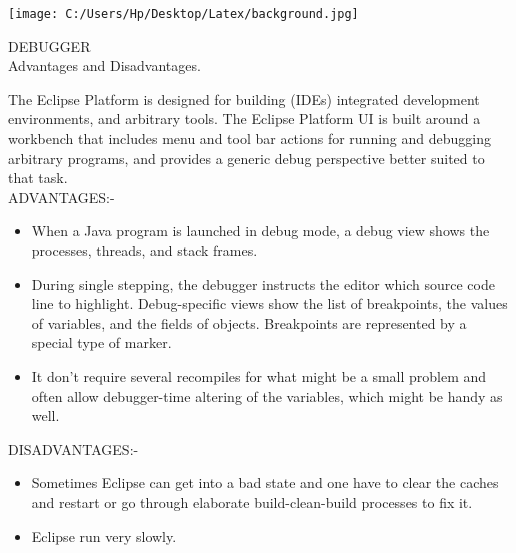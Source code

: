\documentclass[10pt]{article}
\begin{document}
\noindent\begin{minipage}{0.3\textwidth}%
	\texttt{[image: C:/Users/Hp/Desktop/Latex/background.jpg]}
\end{minipage}%
\hfill%
\begin{minipage}{0.6\textwidth}\raggedleft
	DEBUGGER\\
	Advantages and Disadvantages.
\end{minipage}
\newline
\newline
The Eclipse Platform is designed for building (IDEs) integrated development environments, and arbitrary tools. The Eclipse Platform UI is built around a workbench that includes menu and tool bar actions for running and debugging arbitrary programs, and provides a generic debug perspective better suited to that task. \\
ADVANTAGES:-
\begin{itemize} [noitemsep,topsep=0pt]
	\item When a Java program is launched in debug mode, a debug view shows the processes, threads, and stack frames.
	\item During single stepping, the debugger instructs the editor which source
	code line to highlight. Debug-specific views show the list of breakpoints, the values of variables, and the fields of objects. Breakpoints are represented by a special type of marker.
	\item It don't require several recompiles for what might be a small problem and
	often allow debugger-time altering of the variables, which might be handy as well.
\end{itemize}
	DISADVANTAGES:-
	\begin{itemize} [noitemsep,topsep=0pt]
\item	Sometimes Eclipse can get into a bad state and one have to clear the caches and restart or go through elaborate build-clean-build processes to fix it.
\item	Eclipse run very slowly.
\end{itemize}
 
 
 \newpage
 
\end{document}
